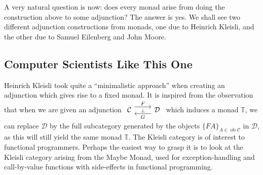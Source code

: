 \documentclass[a4paper,11pt]{article}
\theoremstyle{break_italics}
\theoremstyle{break_upright}
\theoremstyle{remark}
\newcommand{\ob}{\operatorname{ob}}
\newcommand{\C}{\mathcal{C}}
\newcommand{\D}{\mathcal{D}}
\begin{document}
A very natural question is now: does every monad arise from doing the construction above to some adjunction? The answer is yes. We shall see two different adjunction constructions from monads, one due to Heinrich Kleisli, and the other due to Samuel Eilenberg and John Moore.





\subsection{Computer Scientists Like This One}

Heinrich Kleisli took quite a ``minimalistic approach'' when creating an adjunction which gives rise to a fixed monad. It is inspired from the observation that when we are given an adjunction $\begin{tikzcd}
	\C & \D
	\arrow["\bot"{description}, draw=none, from=1-1, to=1-2]
	\arrow["F", shift left=2, from=1-1, to=1-2]
	\arrow["G", shift left=2, from=1-2, to=1-1]
\end{tikzcd}$ which induces a monad $\mathbb T$, we can replace $\D$ by the full subcategory generated by the objects $\{FA\}_{A \in \ob\C}$ in $\D$, as this will still yield the same monad $\mathbb T$. The Kleisli category is of interest to functional programmers. Perhaps the easiest way to grasp it is to look at the Kleisli category arising from the Maybe Monad, used for exception-handling and call-by-value functions with side-effects in functional programming.
\end{document}
